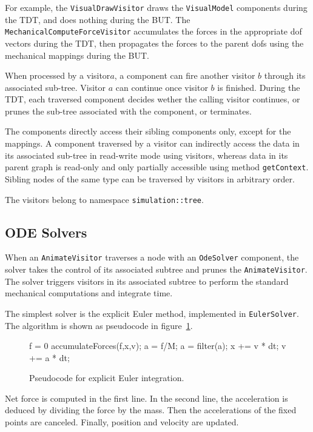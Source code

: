For example, the \texttt{VisualDrawVisitor} draws the \texttt{VisualModel} components during the TDT, and does nothing during the BUT.
The \texttt{MechanicalComputeForceVisitor} accumulates the forces in the appropriate dof vectors during the TDT, then propagates the forces to the parent dofs using the mechanical mappings during the BUT.

When processed by a visitor$a$, a component can fire another visitor $b$ through its associated sub-tree. Visitor $a$ can continue once visitor $b$ is finished.
During the TDT, each traversed component decides wether the calling visitor continues, or prunes the sub-tree associated with the component, or terminates.

The components directly access their sibling components only, except for the mappings.
A component traversed by a visitor can indirectly access the data in its associated sub-tree in read-write mode using visitors, whereas data in its parent graph is read-only and only partially accessible using method \texttt{getContext}.
Sibling nodes of the same type can be traversed by visitors in arbitrary order.

The visitors belong to namespace \texttt{simulation::tree}.

\subsection{ODE Solvers}
When an \texttt{AnimateVisitor} traverses a node with an \texttt{OdeSolver} component, 
the solver takes the control of its associated subtree and prunes the \texttt{AnimateVisitor}. The solver triggers visitors in its associated subtree to perform the standard mechanical computations and integrate time.

The simplest solver is the explicit Euler method, implemented in \texttt{EulerSolver}. The algorithm is shown as pseudocode in figure~\ref{pc:expliciteuler}.
\begin{figure}
\begin{code_cpp}
f = 0
accumulateForces(f,x,v);
a = f/M;
a = filter(a);
x += v * dt;
v += a * dt;
\end{code_cpp}
\caption{Pseudocode for explicit Euler integration.}
\label{pc:expliciteuler}
\end{figure}
Net force is computed in the first line. 
In the second line, the acceleration is deduced by dividing the force by the mass.
Then the accelerations of the fixed points are canceled.
Finally, position and velocity are updated.

